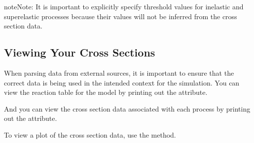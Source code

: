 \documentclass[letterpaper,10pt,english,openany,oneside]{sphinxmanual}
\begin{document}
\begin{enumerate}
\begin{sphinxVerbatim}[commandchars=\\\{\}]
    \PYG{p}{[}   \PYG{p}{]}
\end{sphinxVerbatim}

\begin{sphinxadmonition}{note}{Note:}
\sphinxAtStartPar
It is important to explicitly specify threshold values for
inelastic and superelastic processes because their values will
not be inferred from the cross section data.
\end{sphinxadmonition}

\end{enumerate}


\subsection{Viewing Your Cross Sections}
\label{\detokenize{cs_guide:viewing-your-cross-sections}}
\sphinxAtStartPar
When parsing data from external sources, it is important to ensure
that the correct data is being used in the intended context for the
simulation. You can view the reaction table for the model by
printing out the  attribute.

\begin{sphinxVerbatim}[commandchars=\\\{\}]
\end{sphinxVerbatim}

\sphinxAtStartPar
And you can view the cross section data associated with each process
by printing out the  attribute.

\begin{sphinxVerbatim}[commandchars=\\\{\}]
\end{sphinxVerbatim}

\sphinxAtStartPar
To view a plot of the cross section data, use the {\hyperref[\detokenize{api/pytb.CrossSections.plot_cs:pytb.CrossSections.plot_cs}]{}} method.
\end{document}
